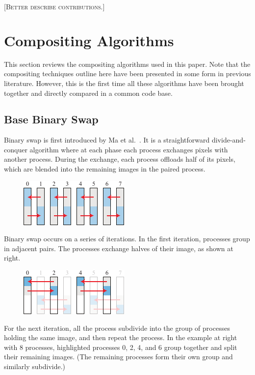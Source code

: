 \documentclass{vgtc}                          %
\newcommand*{\scite}[1]{~\cite{#1}}
\newcommand{\etal}{et al.\xspace}
\newcommand{\fix}[1]{{\color{red}\textsc{[#1]}}}
\begin{document}
\fix{Better describe contributions.}

\section{Compositing Algorithms}

This section reviews the compositing algorithms used in this paper.
Note that the compositing techniques outline here have been presented in some form in previous literature.
However, this is the first time all these algorithms have been brought together and directly compared in a common code base.

\setlength{\intextsep}{0pt}
\setlength{\columnsep}{2ex}

\subsection{Base Binary Swap}
\label{sec:BinarySwap}

Binary swap is first introduced by Ma \etal\scite{BinarySwap1}.
It is a straightforward divide-and-conquer algorithm where at each phase each process exchanges pixels with another process.
During the exchange, each process offloads half of its pixels, which are blended into the remaining images in the paired process.

\begin{figure}
  \includegraphics[scale=.75]{binary-swap-1}
\end{figure}
Binary swap occurs on a series of iterations.
In the first iteration, processes group in adjacent pairs.
The processes exchange halves of their image, as shown at right.

\begin{figure}
  \includegraphics[scale=.75]{binary-swap-2}
\end{figure}
For the next iteration, all the process subdivide into the group of processes holding the same image, and then repeat the process.
In the example at right with 8 processes, highlighted processes 0, 2, 4, and 6 group together and split their remaining images.
(The remaining processes form their own group and similarly subdivide.)
\end{document}
